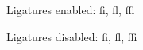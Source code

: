 \documentclass{article}
\begin{document}
Ligatures enabled: fi, fl, ffi

Ligatures disabled: fi, fl, ffi
\end{document}
